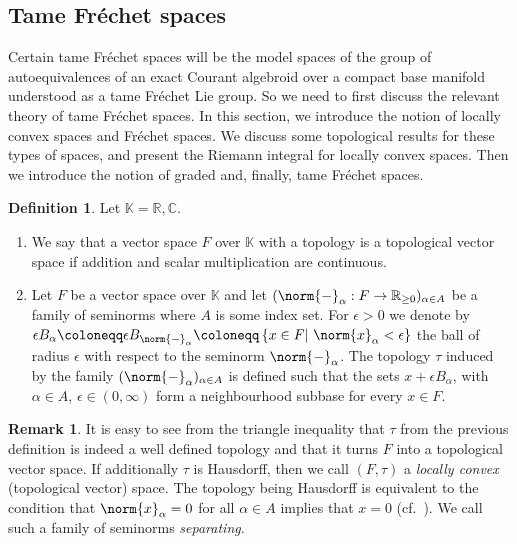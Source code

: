 \documentclass[12pt,a4paper]{article}
\theoremstyle{plain}
\theoremstyle{definition}
\newtheorem{definition}[theorem]{Definition}
\newtheorem{remark}[theorem]{Remark}
\newcommand{\R}{\mathbb{R}}
\newcommand{\K}{\mathbb{K}}
\newcommand{\nnorm}[2]{\norm{#1}_{#2}}
\begin{document}
\subsection{Tame Fréchet spaces}

Certain tame Fréchet spaces will be the model spaces of the group of autoequivalences of an exact Courant algebroid over a compact base manifold understood as a tame Fréchet Lie group. So we need to first discuss the relevant theory of tame Fréchet spaces. In this section, we introduce the notion of locally convex spaces and Fréchet spaces. We discuss some topological results for these types of spaces, and present the Riemann integral for locally convex spaces. Then we introduce the notion of graded and, finally, tame Fréchet spaces.

\begin{definition}
\label{Def:LocConvSpace}
Let $\K=\R,\mathbb{C}$.
\begin{enumerate}
\item We say that a vector space $F$ over $\K$ with a topology is a topological vector space if addition and scalar multiplication are continuous.

\item Let $F$ be a vector space over $\K$ and let $(\nnorm{-}{\alpha}:F\to \R_{\geq 0})_{\alpha\in A}$ be a family of seminorms where $A$ is some index set.
For $\epsilon>0$ we denote by 
$\epsilon B_\alpha \coloneqq \epsilon B_{\nnorm{-}{\alpha}} \coloneqq \left\{x\in F|~\nnorm{x}{\alpha}<\epsilon \right\}$ the ball of radius $\epsilon$ with respect to the seminorm $\nnorm{-}{\alpha}$.
The topology $\tau$ induced by the family $(\nnorm{-}{\alpha})_{\alpha\in A}$ is defined such that the sets $x+\epsilon B_\alpha$, with $\alpha \in A$, $\epsilon \in (0,\infty)$ form a neighbourhood subbase for every $x\in F$.
\end{enumerate}
\end{definition}

\begin{remark}
It is easy to see from the triangle inequality that $\tau$ from the previous definition is indeed a well defined topology and that it turns $F$ into a topological vector space. If additionally $\tau$ is Hausdorff, then we call $(F,\tau)$ a \textit{locally convex} (topological vector) space.
The topology being Hausdorff is equivalent to the condition that $\nnorm{x}{\alpha}=0$ for all $\alpha\in A$ implies that $x=0$ (cf.~\cite[Proposition 4.3.3]{TVSc}). We call such a family of seminorms \textit{separating}.
\end{remark}
\end{document}
